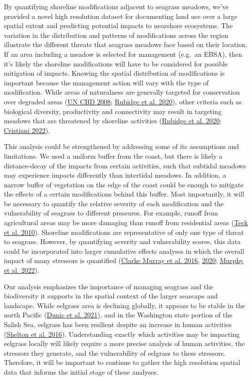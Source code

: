\documentclass[12pt]{article}\usepackage[]{graphicx}\usepackage[]{color}
\begin{document}
By quantifying shoreline modifications adjacent to seagrass meadows, we've provided a novel high resolution dataset for documenting land use over a large spatial extent and predicting potential impacts to nearshore ecosystems. The variation in the distribution and patterns of modifications across the region illustrate the different threats that seagrass meadows face based on their location. If an area including a meadow is selected for management (e.g.~an EBSA), then it's likely the shoreline modifications will have to be considered for possible mitigation of impacts. Knowing the spatial distribution of modifications is important because the management action will vary with the type of modification. While areas of naturalness are generally targeted for conservation over degraded areas (\protect\hyperlink{ref-UNCBD2008}{UN CBD 2008}; \protect\hyperlink{ref-Rubidge2020}{Rubidge et al. 2020}), other criteria such as biological diversity, productivity and connectivity may result in targeting meadows that are threatened by shoreline activities (\protect\hyperlink{ref-Rubidge2020}{Rubidge et al. 2020}; \protect\hyperlink{ref-cristiani2022}{Cristiani 2022}).

This analysis could be strengthened by addressing some of its assumptions and limitations. We used a uniform buffer from the coast, but there is likely a distance-decay of the impacts from certain activities, such that subtidal meadows may experience impacts differently than intertidal meadows. In addition, a narrow buffer of vegetation on the edge of the coast could be enough to mitigate the effects of a certain modifications behind this buffer. Most importantly, it will be necessary to quantify the relative severity of each modification and the vulnerability of seagrass to different pressures. For example, runoff from agricultural areas may be more damaging than runoff from residential areas (\protect\hyperlink{ref-Teck2010}{Teck et al. 2010}). Shoreline modifications are representative of only one type of threat to seagrass. However, by quantifying severity and vulnerability scores, this data could be incorporated into larger cumulative effects analyses in which the overall impact of many stressors is quantified (\protect\hyperlink{ref-ClarkeMurray2016}{Clarke Murray et al. 2016}, \protect\hyperlink{ref-ClarkeMurray2020}{2020}; \protect\hyperlink{ref-Murphy2022}{Murphy et al. 2022}).

Our analysis emphasizes the importance of managing seagrass and the biodiversity it supports in the spatial context of the larger seascape and landscape. While eelgrass area is declining globally, it appears to be stable in the north Pacific (\protect\hyperlink{ref-Dunic2021}{Dunic et al. 2021}), and in the Washington state portion of the Salish Sea, eelgrass has been resilient despite an increase in human activities (\protect\hyperlink{ref-Shelton2016}{Shelton et al. 2016}). Understanding exactly which activities may be impacting eelgrass locally will likely require a more precise analysis of human activities, the stressors they generate, and the vulnerability of eelgrass to these stressors. Therefore, it will be important to continue to gather the high resolution spatial data that informs the initial stage of these analyses.
\end{document}
